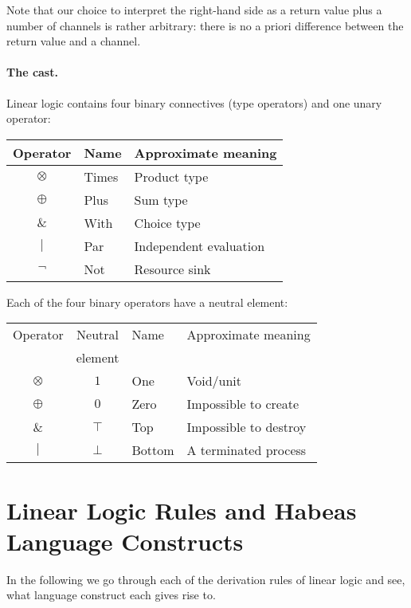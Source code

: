 \documentclass[a4paper]{article}
\begin{document}
Note that our choice to interpret the right-hand side as a return
value plus a number of channels is rather arbitrary: there is no a
priori difference between the return value and a channel.

\paragraph{The cast.} Linear logic contains four binary connectives (type operators) and
one unary operator:
\begin{center}
  \begin{tabular}{c|l|l}
    \hline
    \hline
    Operator & Name & Approximate meaning\\
    \hline
    $\otimes$ & Times & Product type\\
    $\oplus$  & Plus  & Sum type\\
    $\&$      & With  & Choice type\\
    $|$       & Par   & Independent evaluation\\
    \hline
    $\lnot$   & Not   & Resource sink\\
    \hline
  \end{tabular}
\end{center}

Each of the four binary operators have a neutral element:
\begin{center}
  \begin{tabular}{c|c|l|l}
    \hline
    \hline
    Operator & Neutral & Name & Approximate meaning\\
             & element &&\\
    \hline
    $\otimes$ & $1$    & One    & Void/unit\\
    $\oplus$  & $0$    & Zero   & Impossible to create\\
    $\&$      & $\top$ & Top    & Impossible to destroy\\
    $|$       & $\bot$ & Bottom & A terminated process\\
    \hline
  \end{tabular}
\end{center}


\section{Linear Logic Rules and Habeas Language Constructs}

In the following we go through each of the derivation rules of linear
logic and see, what language construct each gives rise to.
\end{document}

